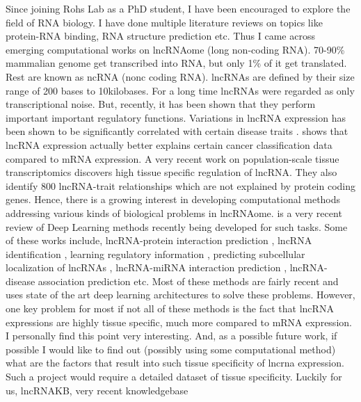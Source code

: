 Since joining Rohs Lab as a PhD student, I have been encouraged to explore the field of RNA biology.
I have done multiple literature reviews on topics like protein-RNA binding, RNA structure
prediction etc. Thus I came across emerging computational works on lncRNAome (long
non-coding RNA). 
70-90\% mammalian genome get transcribed into RNA, but only 1\% of it get translated. Rest are known
as ncRNA (nonc coding RNA). lncRNAs are defined by their size range of 200 bases to 10kilobases.
For a long time lncRNAs were regarded as only transcriptional noise. But, recently, it has been
shown that they perform important important regulatory functions. Variations in lncRNA expression
has been shown to be significantly correlated with certain disease traits \citep{wapinski2011long}. 
\citet{al2019long} shows that lncRNA expression actually better explains certain cancer
classification data compared to mRNA expression. A very recent work on population-scale tissue transcriptomics \citep{de2021population}
discovers high tissue specific regulation of lncRNA. They also identify 800 lncRNA-trait relationships which are not explained by protein coding genes.
Hence, there is a growing interest in developing
computational methods addressing various kinds of biological problems in lncRNAome.
\citet{alam2020deep} is a very recent review of Deep Learning methods recently being developed for
such tasks. Some of these works include, lncRNA-protein interaction prediction
\citep{pan2016ipminer, zhao2018bipartite, yi2018deep, zhan2019bgfe, peng2019rpiter}, lncRNA 
identification \citep{baek2018lncrnanet,yang2018lncadeep, tripathi2016deeplnc},
learning regulatory information \citep{alam2019deepcnpp, alam2019deepel}, predicting subcellular
localization of lncRNAs \citep{gudenas2018prediction},    lncRNA-miRNA interaction prediction
\citep{huang2019predicting}, lncRNA-disease association prediction \citep{hu2019deep, xuan2019dual,
al2019long, xuan2019graph} etc. Most of these methods are fairly recent and uses state of the art
deep learning architectures to solve these problems. However, one key problem for most if not all of
these methods is the fact that lncRNA expressions are highly tissue specific, much more compared to
mRNA expression. I personally find this point very interesting. And, as a possible future work, if
possible I would like to find out (possibly using some computational method) what are the factors
that result into such tissue specificity of lncrna expression. Such a project would require a
detailed dataset of tissue specificity. Luckily for us, lncRNAKB,  very recent knowledgebase
